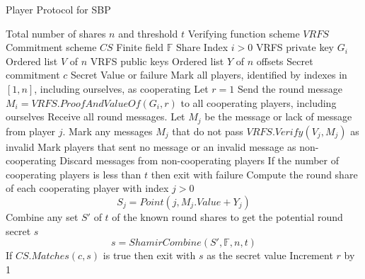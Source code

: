 \documentclass[12pt]{dalcsthesis}
\begin{document}
\begin{algorithm}
  \caption{Player Protocol for SBP}
  \label{alg:SBP:Player}
  \begin{algorithmic}
    \INPUT Total number of shares $n$ and threshold $t$
    \INPUT Verifying function scheme $VRFS$
    \INPUT Commitment scheme $CS$
    \INPUT Finite field $\mathbb{F}$
    \INPUT Share Index $i > 0$
    \INPUT VRFS private key $G_i$
    \INPUT Ordered list $V$ of $n$ VRFS public keys
    \INPUT Ordered list $Y$ of $n$ offsets
    \INPUT Secret commitment $c$
    \OUTPUT Secret Value or failure
    \STATE Mark all players, identified by indexes in $[1, n]$, including ourselves, as cooperating
    \STATE Let $r = 1$
      \STATE Send the round message $M_i = VRFS.ProofAndValueOf(G_i, r)$ to all cooperating players, including ourselves
      \STATE Receive all round messages. Let $M_j$ be the message or lack of message from player $j$.
      \STATE Mark any messages $M_j$ that do not pass $VRFS.Verify(V_j, M_j)$ as invalid
      \STATE Mark players that sent no message or an invalid message as non-cooperating
      \STATE Discard messages from non-cooperating players
      \STATE If the number of cooperating players is less than $t$ then exit with failure
      \STATE Compute the round share of each cooperating player with index $j > 0$
			$$S_j = Point(j, M_j.Value + Y_j)$$
      \STATE Combine any set $S'$ of $t$ of the known round shares to get the potential round secret $s$
      		$$s = ShamirCombine(S', \mathbb{F}, n, t)$$
      \STATE If $CS.Matches(c, s)$ is true then exit with $s$ as the secret value
      \STATE Increment $r$ by 1
    \ENDWHILE
  \end{algorithmic}
\end{algorithm}
\end{document}
